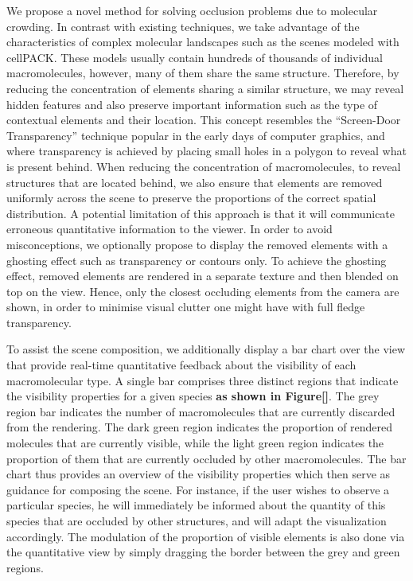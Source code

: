 We propose a novel method for solving occlusion problems due to molecular crowding.
In contrast with existing techniques, we take advantage of the characteristics of complex molecular landscapes such as the scenes modeled with cellPACK.
These models usually contain hundreds of thousands of individual macromolecules, however, many of them share the same structure.
Therefore, by reducing the concentration of elements sharing a similar structure, we may reveal hidden features and also preserve important information such as the type of contextual elements and their location.
This concept resembles the “Screen-Door Transparency” technique popular in the early days of computer graphics, and where transparency is achieved by placing small holes in a polygon to reveal what is present behind.
When reducing the concentration of macromolecules, to reveal structures that are located behind, we also ensure that elements are removed uniformly across the scene to preserve the proportions of the correct spatial distribution.
A potential limitation of this approach is that it will communicate erroneous quantitative information to the viewer.
In order to avoid misconceptions, we optionally propose to display the removed elements with a ghosting effect such as transparency or contours only.
To achieve the ghosting effect, removed elements are rendered in a separate texture and then blended on top on the view.
Hence, only the closest occluding elements from the camera are shown, in order to minimise visual clutter one might have with full fledge transparency.

To assist the scene composition, we additionally display a bar chart over the view that provide real-time quantitative feedback about the visibility of each macromolecular type.
A single bar comprises three distinct regions that indicate the visibility properties for a given species \textbf{as shown in Figure[]}.
The grey region bar indicates the number of macromolecules that are currently discarded from the rendering.
The dark green region indicates the proportion of rendered molecules that are currently visible, while the light green region indicates the proportion of them that are currently occluded by other macromolecules.
The bar chart thus provides an overview of the visibility properties which then serve as guidance for composing the scene.
For instance, if the user wishes to observe a particular species, he will immediately be informed about the quantity of this species that are occluded by other structures, and will adapt the visualization accordingly.
The modulation of the proportion of visible elements is also done via the quantitative view by simply dragging the border between the grey and green regions. 

